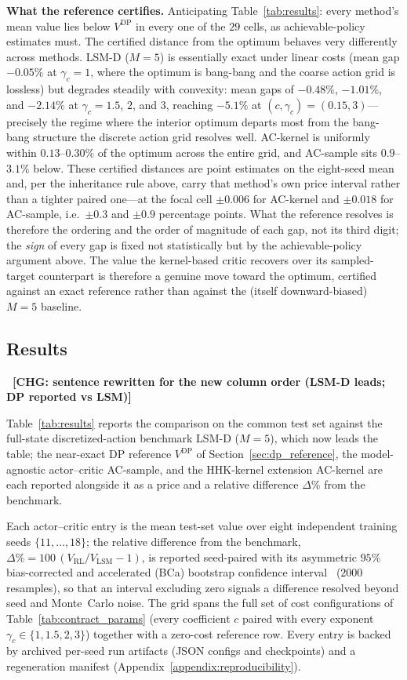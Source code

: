 \documentclass[a4paper,fleqn]{cas-dc}
\newcommand{\hlblock}[1]{\par\noindent
    \colorbox{chgyellow}{\parbox{\dimexpr\linewidth-2\fboxsep\relax}{#1}}\par}
\newcommand{\hlpar}[2]{\hlblock{\textbf{#1} #2}}
\newcommand{\hlblock}[1]{#1}
\newcommand{\hlpar}[2]{\paragraph{#1} #2}
\newcommand{\chg}[1]{{\normalfont\bfseries\color{red}~[CHG: \textsf{\footnotesize #1}]~}}
\newcommand{\chg}[1]{}
\begin{document}
\hlpar{What the reference certifies.}{Anticipating Table~\ref{tab:results}: every method's mean value lies below $V^{\mathrm{DP}}$ in every one of the $29$ cells, as achievable-policy estimates must. The certified distance from the optimum behaves very differently across methods. LSM-D ($M{=}5$) is essentially exact under linear costs (mean gap $-0.05\%$ at $\gamma_c=1$, where the optimum is bang-bang and the coarse action grid is lossless) but degrades steadily with convexity: mean gaps of $-0.48\%$, $-1.01\%$, and $-2.14\%$ at $\gamma_c=1.5$, $2$, and $3$, reaching $-5.1\%$ at $(c,\gamma_c)=(0.15,3)$---precisely the regime where the interior optimum departs most from the bang-bang structure the discrete action grid resolves well. AC-kernel is uniformly within $0.13$--$0.30\%$ of the optimum across the entire grid, and AC-sample sits $0.9$--$3.1\%$ below. These certified distances are point estimates on the eight-seed mean and, per the inheritance rule above, carry that method's own price interval rather than a tighter paired one---at the focal cell $\pm0.006$ for AC-kernel and $\pm0.018$ for AC-sample, i.e.\ $\pm0.3$ and $\pm0.9$ percentage points. What the reference resolves is therefore the ordering and the order of magnitude of each gap, not its third digit; the \emph{sign} of every gap is fixed not statistically but by the achievable-policy argument above. The value the kernel-based critic recovers over its sampled-target counterpart is therefore a genuine move toward the optimum, certified against an exact reference rather than against the (itself downward-biased) $M=5$ baseline.}

\subsection{Results}

\chg{sentence rewritten for the new column order (LSM-D leads; DP reported vs LSM)}%
\hlblock{Table~\ref{tab:results} reports the comparison on the common test set against the full-state discretized-action benchmark LSM-D ($M=5$), which now leads the table; the near-exact DP reference $V^{\mathrm{DP}}$ of Section~\ref{sec:dp_reference}, the model-agnostic actor--critic AC-sample, and the HHK-kernel extension AC-kernel are each reported alongside it as a price and a relative difference $\Delta\%$ from the benchmark.}
Each actor--critic entry is the mean test-set value over eight independent training seeds $\{11,\dots,18\}$; the relative difference from the benchmark, $\Delta\% = 100\,(V_{\mathrm{RL}}/V_{\mathrm{LSM}}-1)$, is reported seed-paired with its asymmetric $95\%$ bias-corrected and accelerated (BCa) bootstrap confidence interval~\cite{efron1987bca,efron1993bootstrap} ($2000$ resamples), so that an interval excluding zero signals a difference resolved beyond seed and Monte~Carlo noise. The grid spans the full set of cost configurations of Table~\ref{tab:contract_params} (every coefficient $c$ paired with every exponent $\gamma_c\in\{1,1.5,2,3\}$) together with a zero-cost reference row. Every entry is backed by archived per-seed run artifacts (JSON configs and checkpoints) and a regeneration manifest (Appendix~\ref{appendix:reproducibility}).
\end{document}
